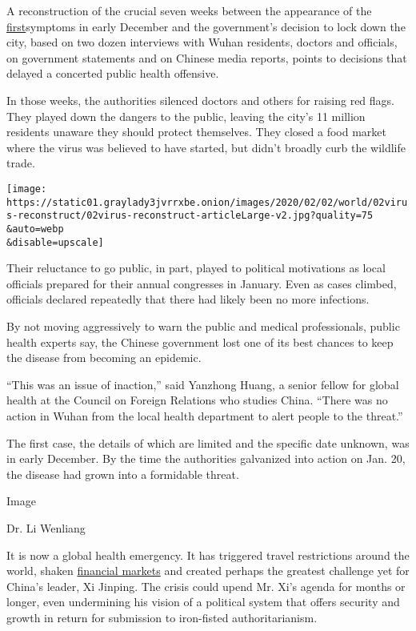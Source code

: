 A reconstruction of the crucial seven weeks between the appearance of
the
\href{https://www.thelancet.com/journals/lancet/article/PIIS0140-6736(20)30183-5/fulltext}{first}symptoms
in early December and the government's decision to lock down the city,
based on two dozen interviews with Wuhan residents, doctors and
officials, on government statements and on Chinese media reports, points
to decisions that delayed a concerted public health offensive.

In those weeks, the authorities silenced doctors and others for raising
red flags. They played down the dangers to the public, leaving the
city's 11 million residents unaware they should protect themselves. They
closed a food market where the virus was believed to have started, but
didn't broadly curb the wildlife trade.

\texttt{[image: https://static01.graylady3jvrrxbe.onion/images/2020/02/02/world/02virus-reconstruct/02virus-reconstruct-articleLarge-v2.jpg?quality=75\\\&auto=webp\\\&disable=upscale]}

Their reluctance to go public, in part, played to political motivations
as local officials prepared for their annual congresses in January. Even
as cases climbed, officials declared repeatedly that there had likely
been no more infections.

By not moving aggressively to warn the public and medical professionals,
public health experts say, the Chinese government lost one of its best
chances to keep the disease from becoming an epidemic.

``This was an issue of inaction,'' said Yanzhong Huang, a senior fellow
for global health at the Council on Foreign Relations who studies China.
``There was no action in Wuhan from the local health department to alert
people to the threat.''

The first case, the details of which are limited and the specific date
unknown, was in early December. By the time the authorities galvanized
into action on Jan. 20, the disease had grown into a formidable threat.

Image

Dr. Li Wenliang

It is now a global health emergency. It has triggered travel
restrictions around the world, shaken
\href{https://www.nytimes3xbfgragh.onion/2020/01/29/business/china-coronavirus-economy.html}{financial
markets} and created perhaps the greatest challenge yet for China's
leader, Xi Jinping. The crisis could upend Mr. Xi's agenda for months or
longer, even undermining his vision of a political system that offers
security and growth in return for submission to iron-fisted
authoritarianism.

